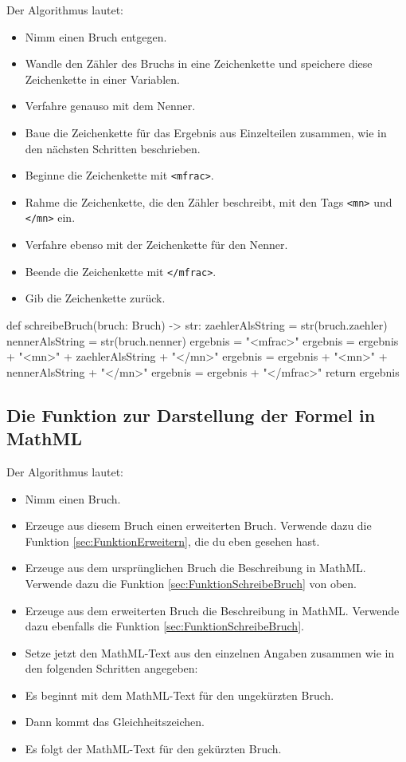 Der Algorithmus lautet:
\begin{itemize}
	\item Nimm einen Bruch entgegen.
	\item Wandle den Zähler des Bruchs in eine Zeichenkette und speichere diese Zeichenkette in einer Variablen.
	\item Verfahre genauso mit dem Nenner.
	\item Baue die Zeichenkette für das Ergebnis aus Einzelteilen zusammen, wie in den nächsten Schritten beschrieben.
	\item Beginne die Zeichenkette mit \texttt{<mfrac>}.
	\item Rahme die Zeichenkette, die den Zähler beschreibt, mit den Tags \texttt{<mn>} und \texttt{</mn>} ein.
	\item Verfahre ebenso mit der Zeichenkette für den Nenner.
	\item Beende die Zeichenkette mit \texttt{</mfrac>}.
	\item Gib die Zeichenkette zurück.
\end{itemize}

\begin{codePython}
def schreibeBruch(bruch: Bruch) -> str:
	zaehlerAlsString = str(bruch.zaehler)
	nennerAlsString = str(bruch.nenner)
	ergebnis = "<mfrac>"
	ergebnis = ergebnis + "<mn>" + zaehlerAlsString + "</mn>"
	ergebnis = ergebnis + "<mn>" + nennerAlsString + "</mn>"
	ergebnis = ergebnis + "</mfrac>"
	return ergebnis
\end{codePython}

\subsection{Die Funktion zur Darstellung der Formel in MathML}

Der Algorithmus lautet:
\begin{itemize}
	\item Nimm einen Bruch.
	\item Erzeuge aus diesem Bruch einen erweiterten Bruch. Verwende dazu die Funktion \ref{sec:FunktionErweitern}, die du eben gesehen hast.
	\item Erzeuge aus dem ursprünglichen Bruch die Beschreibung in MathML. Verwende dazu die Funktion \ref{sec:FunktionSchreibeBruch} von oben.
	\item Erzeuge aus dem erweiterten Bruch die Beschreibung in MathML. Verwende dazu ebenfalls die Funktion \ref{sec:FunktionSchreibeBruch}.
	\item Setze jetzt den MathML-Text aus den einzelnen Angaben zusammen wie in den folgenden Schritten angegeben:
	\item Es beginnt mit dem MathML-Text für den ungekürzten Bruch.
	\item Dann kommt das Gleichheitszeichen.
	\item Es folgt der MathML-Text für den gekürzten Bruch.
\end{itemize}

